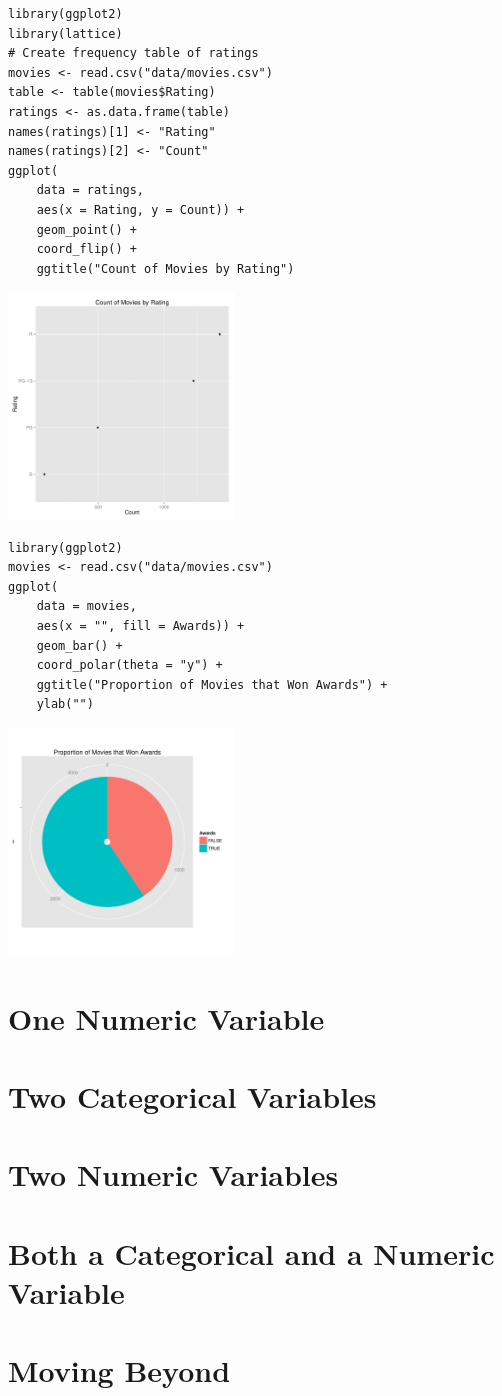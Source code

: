 \documentclass[a4paper, captions=tableheading]{tufte-book}
\begin{document}
\begin{verbatim}
library(ggplot2)
library(lattice)
# Create frequency table of ratings
movies <- read.csv("data/movies.csv")
table <- table(movies$Rating)
ratings <- as.data.frame(table)
names(ratings)[1] <- "Rating"
names(ratings)[2] <- "Count"
ggplot(
	data = ratings,
	aes(x = Rating, y = Count)) +
	geom_point() +
	coord_flip() +
	ggtitle("Count of Movies by Rating")
\end{verbatim}

\includegraphics[height=6cm]{img/1-cat-ggplot2-02.pdf}

\begin{verbatim}
library(ggplot2)
movies <- read.csv("data/movies.csv")
ggplot(
	data = movies,
	aes(x = "", fill = Awards)) +
	geom_bar() +
	coord_polar(theta = "y") +
	ggtitle("Proportion of Movies that Won Awards") +
	ylab("")
\end{verbatim}

\includegraphics[height=6cm]{img/1-cat-ggplot2-03.pdf}


\section{One Numeric Variable}
\label{sec:orgheadline7}

\section{Two Categorical Variables}
\label{sec:orgheadline8}

\section{Two Numeric Variables}
\label{sec:orgheadline9}

\section{Both a Categorical and a Numeric Variable}
\label{sec:orgheadline10}

\section{Moving Beyond}
\label{sec:orgheadline11}
\end{document}
